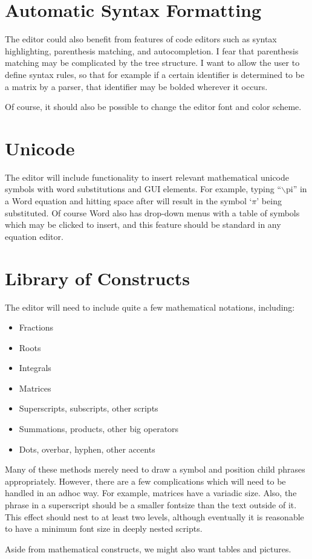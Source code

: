 \documentclass[12pt]{article}
\begin{document}
\section{Automatic Syntax Formatting}

The editor could also benefit from features of code editors such as syntax highlighting, parenthesis matching, and autocompletion. I fear that parenthesis matching may be complicated by the tree structure. I want to allow the user to define syntax rules, so that for example if a certain identifier is determined to be a matrix by a parser, that identifier may be bolded wherever it occurs.

Of course, it should also be possible to change the editor font and color scheme.

\section{Unicode}

The editor will include functionality to insert relevant mathematical unicode symbols with word substitutions and GUI elements. For example, typing ``$\backslash$pi'' in a Word equation and hitting space after will result in the symbol `$\pi$' being substituted. Of course Word also has drop-down menus with a table of symbols which may be clicked to insert, and this feature should be standard in any equation editor.

\section{Library of Constructs}

The editor will need to include quite a few mathematical notations, including:
\begin{itemize}
\item Fractions
\item Roots
\item Integrals
\item Matrices
\item Superscripts, subscripts, other scripts
\item Summations, products, other big operators
\item Dots, overbar, hyphen, other accents
\end{itemize}
Many of these methods merely need to draw a symbol and position child phrases appropriately. However, there are a few complications which will need to be handled in an adhoc way. For example, matrices have a variadic size. Also, the phrase in a superscript should be a smaller fontsize than the text outside of it. This effect should nest to at least two levels, although eventually it is reasonable to have a minimum font size in deeply nested scripts.

Aside from mathematical constructs, we might also want tables and pictures.
\end{document}
